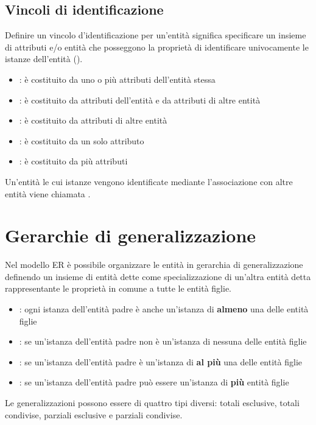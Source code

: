 \documentclass[12pt, a4paper]{report}
\begin{document}
    \subsection{Vincoli di identificazione}
    Definire un vincolo d'identificazione per un'entità significa specificare un insieme di attributi e/o entità che posseggono la proprietà di identificare univocamente le istanze dell'entità ().
    \begin{itemize}
        \item {}: è costituito da uno o più attributi dell'entità stessa
        \item {}: è costituito da attributi dell'entità e da attributi di altre entità
        \item {}: è costituito da attributi di altre entità
        \item {}: è costituito da un solo attributo
        \item {}: è costituito da più attributi
    \end{itemize}
    Un'entità le cui istanze vengono identificate mediante l'associazione con altre entità viene chiamata .
    \section{Gerarchie di generalizzazione}
    Nel modello ER è possibile organizzare le entità in gerarchia di generalizzazione definendo un insieme di entità dette  come specializzazione di un'altra entità detta  rappresentante le proprietà in comune a tutte le entità figlie.
    \begin{itemize}
        \item {}: ogni istanza dell'entità padre è anche un'istanza di \textbf{almeno} una delle entità figlie
        \item {}: se un'istanza dell'entità padre non è un'istanza di nessuna delle entità figlie
        \item {}: se un'istanza dell'entità padre è un'istanza di \textbf{al più} una delle entità figlie
        \item {}: se un'istanza dell'entità padre può essere un'istanza di \textbf{più} entità figlie
    \end{itemize}
    Le generalizzazioni possono essere di quattro tipi diversi: totali esclusive, totali condivise, parziali esclusive e parziali condivise.
\end{document}

